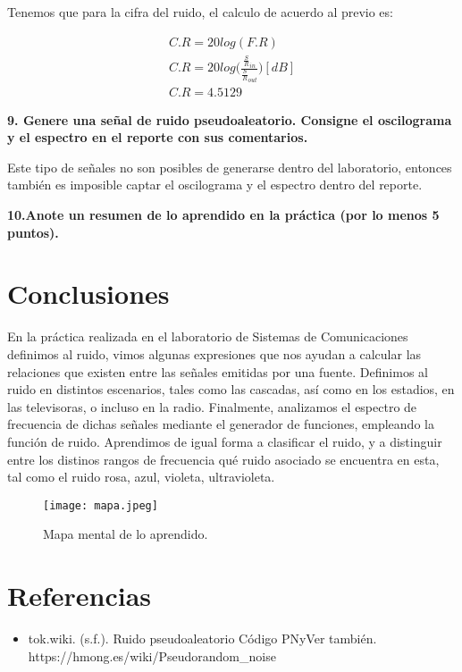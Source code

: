 \documentclass[12pt, a4paper]{article}
\begin{document}
Tenemos que para la cifra del ruido, el calculo de acuerdo al previo es:

\begin{gather*}
  C.R = 20log(F.R) \\
  C.R = 20log\big(\frac{\frac{S}{R}_{in}}{\frac{S}{R}_{out}}\big) [dB] \\
  C.R = 4.5129
\end{gather*}

\textbf{9. Genere una señal de ruido pseudoaleatorio. Consigne el oscilograma y el espectro en el reporte con sus comentarios.} \par

Este tipo de señales no son posibles de generarse dentro del laboratorio, entonces también es imposible captar el oscilograma y el espectro dentro del reporte.

\textbf{10.Anote un resumen de lo aprendido en la práctica (por lo menos 5 puntos).} \par

\section{Conclusiones}

En la práctica realizada en el laboratorio de Sistemas de Comunicaciones definimos al ruido, vimos algunas expresiones que nos ayudan a calcular las relaciones que existen entre las señales emitidas por una fuente. Definimos al ruido en distintos escenarios, tales como las cascadas, así como en los estadios, en las televisoras, o incluso en la radio.
Finalmente, analizamos el espectro de frecuencia de dichas señales mediante el generador de funciones, empleando la función de ruido.
Aprendimos de igual forma a clasificar el ruido, y a distinguir entre los distinos rangos de frecuencia qué ruido asociado se encuentra en esta, tal como el ruido rosa, azul, violeta, ultravioleta.

\begin{figure}[H]
  \centering
  \texttt{[image: mapa.jpeg]}
  \caption{Mapa mental de lo aprendido.}
\end{figure}

\section{Referencias}
\begin{itemize}
  \item tok.wiki. (s.f.). Ruido pseudoaleatorio Código PNyVer también. https://hmong.es/wiki/Pseudorandom\_noise
\end{itemize}
\end{document}
